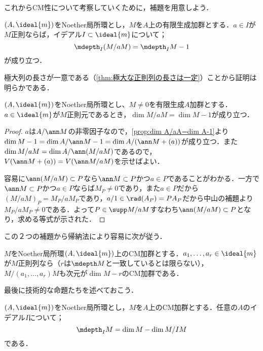 これからCM性について考察していくために，補題を用意しよう．

\begin{lem}\label{lem:depth M/aM=depth M-1}
	$(A,\ideal{m})$をNoether局所環とし，$M$を$A$上の有限生成加群とする．$a\in I$が$M$正則ならば，イデアル$I\subset\ideal{m}$について；
	\[\mdepth_I (M/aM)=\mdepth_I M-1\]
	が成り立つ．
\end{lem}

極大列の長さが一意である（\ref{thm:極大な正則列の長さは一定}）ことから証明は明らかである．

\begin{lem}\label{lem:dim M/aM=dim M-1}
	$(A,\ideal{m})$をNoether局所環とし、$M\neq0$を有限生成$A$加群とする．$a\in\ideal{m}$が$M$正則元であるとき，$\dim M/aM=\dim M-1$が成り立つ．
\end{lem}

\begin{proof}
	$a$は$A/\ann M$の非零因子なので，\ref{prop:dim A/aA=dim A-1}より$\dim M-1=\dim A/\ann M-1=\dim A/(\ann M+(a))$が成り立つ．また$\dim M/aM=\dim A/\ann(M/aM)$であるので，$V(\ann M+(a))=V(\ann M/aM)$を示せばよい．
	
	容易に$\ann(M/aM)\subset P$なら$\ann M\subset P$かつ$a\in P$であることがわかる．一方で$\ann M\subset P$かつ$a\in P$ならば$M_P\neq0$であり，また$a\in P$だから$(M/aM)_P=M_P/aM_P$であり，$a/1\in\rad (A_P)=PA_P$だから中山の補題より$M_P/aM_P\neq0$である．よって$P\in\supp M/aM$すなわち$\ann(M/aM)\subset P$となり，求める等式が示された．
\end{proof}

この２つの補題から帰納法により容易に次が従う．
\begin{cor}\label{cor:CMの正則列による商もCM}
	$M$をNoether局所環$(A,\ideal{m})$上のCM加群とする．$a_1,\dots,a_r\in\ideal{m}$が$M$正則列なら（$r$は$\mdepth M$と一致しているとは限らない），$M/(a_1,\dots,a_r)M$も次元が$\dim M-r$のCM加群である．
\end{cor}

最後に技術的な命題たちを述べておこう．

\begin{prop}\label{prop:depth_I M=dim M-dim M/IM}
	$(A,\ideal{m})$をNoether局所環とし，$M$を$A$上のCM加群とする．任意の$A$のイデアル$I$について；
	\[\mdepth_I M=\dim M-\dim M/IM\]
	である．
\end{prop}

